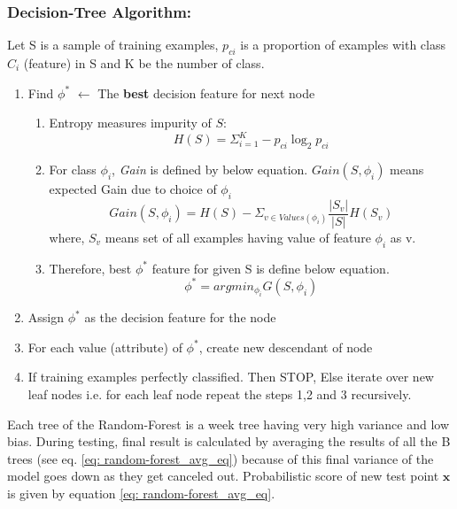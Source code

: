 \documentclass[twoside]{iitbreport}
\begin{document}
\subsubsection{Decision-Tree Algorithm:}\label{subsec: Decision-Tree}
Let S is a sample of training examples,  $p_{ci}$ is a proportion of examples with class $C_i$ (feature) in S and K be the number of class.
\begin{enumerate}
    \item Find $\phi^*$ $\leftarrow$  The \textbf{best} decision feature for next node
    \begin{enumerate}
        \item Entropy measures impurity of $S$: 
            \begin{equation}
                H(S) =  \Sigma^{K}_{i=1} - p_{ci} \log_{2} p_{ci}
            \end{equation}
        \item For class $\phi_i$, \textit{Gain} is defined by below equation. $ Gain(S,\phi_i )$ means expected Gain due to choice of $\phi_i$
            \begin{equation}
                Gain(S,\phi_i ) = H(S) - \Sigma_{v \in Values(\phi_i)} \frac{|S_v|}{|S|} H(S_v)
            \end{equation}
        where, $S_v$ means set of all examples having value of feature $\phi_i$ as v.
        \item Therefore, best $\phi^*$ feature for given S is define below equation.
             \begin{equation}
                \phi^*  =  argmin_{\phi_i} G(S,\phi_i)
            \end{equation}
    \end{enumerate}
    \item Assign $\phi^*$ as the decision feature for the node
    \item For each value (attribute) of $\phi^*$, create new descendant of node
    \item If training examples perfectly classified. Then STOP, Else iterate over new leaf nodes i.e. for each leaf node repeat the steps 1,2 and 3 recursively.
\end{enumerate}

Each tree of the Random-Forest is a week tree having very high variance and low bias. During testing, final result is calculated by averaging the results of all the B trees (see eq. \ref{eq: random-forest_avg_eq}) because of this final variance of the model goes down as they get canceled out. Probabilistic  score of new test point $\boldsymbol{x}$ is given by equation \ref{eq: random-forest_avg_eq}.
\end{document}
